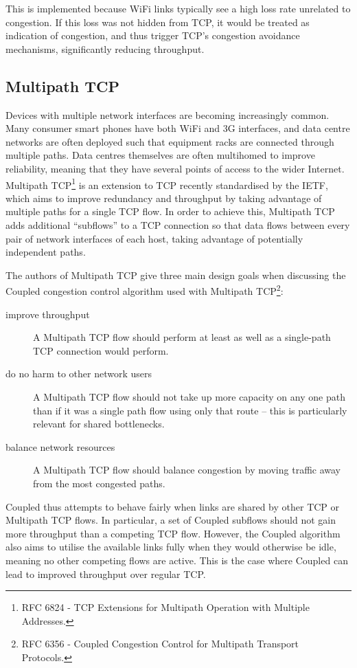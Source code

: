 This is implemented because WiFi links typically see a high loss rate unrelated
to congestion. If this loss was not hidden from TCP, it would be treated as
indication of congestion, and thus trigger TCP's congestion avoidance
mechanisms, significantly reducing throughput.

\subsection{Multipath TCP}
\label{sec:bg:mptcp}
Devices with multiple network interfaces are becoming increasingly common. Many
consumer smart phones have both WiFi and 3G interfaces, and data centre networks
are often deployed such that equipment racks are connected through multiple
paths. Data centres themselves are often multihomed to improve reliability,
meaning that they have several points of access to the wider Internet. Multipath
TCP\footnote{RFC 6824 - TCP Extensions for Multipath Operation with Multiple
Addresses.} is an extension to TCP recently standardised by the IETF, which aims
to improve redundancy and throughput by taking advantage of multiple paths for a
single TCP flow. In order to achieve this, Multipath TCP adds additional
``subflows'' to a TCP connection so that data flows between every pair of
network interfaces of each host, taking advantage of potentially independent
paths.

The authors of Multipath TCP give three main design goals when discussing the
Coupled congestion control algorithm used with Multipath TCP\footnote{RFC 6356 -
 Coupled Congestion Control for Multipath Transport Protocols.}:

\begin{description}
  \item[improve throughput] A Multipath TCP flow should perform at least as well
    as a single-path TCP connection would perform.
  \item[do no harm to other network users] A Multipath TCP flow should not take
    up more capacity on any one path than if it was a single path flow using
    only that route -- this is particularly relevant for shared bottlenecks.
  \item[balance network resources] A Multipath TCP flow should balance
    congestion by moving traffic away from the most congested paths.
\end{description}

Coupled thus attempts to behave fairly when links are shared by other TCP or
Multipath TCP flows. In particular, a set of Coupled subflows should not gain
more throughput than a competing TCP flow. However, the Coupled algorithm also
aims to utilise the available links fully when they would otherwise be idle,
meaning no other competing flows are active. This is the case where Coupled can
lead to improved throughput over regular TCP.

